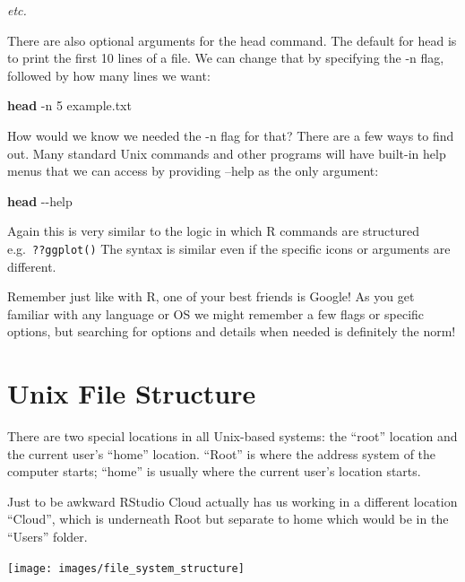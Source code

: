 \documentclass[
]{book}
\newenvironment{Shaded}{\begin{snugshade}}{\end{snugshade}}
\newcommand{\AttributeTok}[1]{\textcolor[rgb]{0.13,0.29,0.53}{#1}}
\newcommand{\FunctionTok}[1]{\textcolor[rgb]{0.13,0.29,0.53}{\textbf{#1}}}
\newcommand{\NormalTok}[1]{#1}
\begin{document}
\emph{etc.}

There are also optional arguments for the head command. The default for head is to print the first 10 lines of a file. We can change that by specifying the -n flag, followed by how many lines we want:

\begin{Shaded}
\begin{Highlighting}[]
    \FunctionTok{head} \AttributeTok{{-}n}\NormalTok{ 5 example.txt}
\end{Highlighting}
\end{Shaded}

How would we know we needed the -n flag for that? There are a few ways to find out. Many standard Unix commands and other programs will have built-in help menus that we can access by providing --help as the only argument:

\begin{Shaded}
\begin{Highlighting}[]
    \FunctionTok{head} \AttributeTok{{-}{-}help}
\end{Highlighting}
\end{Shaded}

Again this is very similar to the logic in which R commands are structured e.g.~\texttt{??ggplot()} The syntax is similar even if the specific icons or arguments are different.

Remember just like with R, one of your best friends is Google! As you get familiar with any language or OS we might remember a few flags or specific options, but searching for options and details when needed is definitely the norm!

\hypertarget{unix-file-structure}{%
\section{Unix File Structure}\label{unix-file-structure}}

There are two special locations in all Unix-based systems: the ``root'' location and the current user's ``home'' location. ``Root'' is where the address system of the computer starts; ``home'' is usually where the current user's location starts.

Just to be awkward RStudio Cloud actually has us working in a different location ``Cloud'', which is underneath Root but separate to home which would be in the ``Users'' folder.

\begin{center}\texttt{[image: images/file\_system\_structure]} \end{center}
\end{document}
